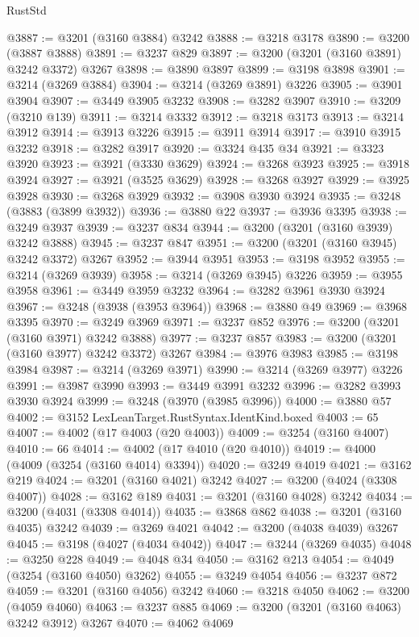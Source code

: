 \begin{lexlean}{RustStd}
\begin{coremodule}
@3887 := @3201 (@3160 @3884) @3242
@3888 := @3218 @3178
@3890 := @3200 (@3887 @3888)
@3891 := @3237 @829
@3897 := @3200 (@3201 (@3160 @3891) @3242 @3372) @3267
@3898 := @3890 @3897
@3899 := @3198 @3898
@3901 := @3214 (@3269 @3884)
@3904 := @3214 (@3269 @3891) @3226
@3905 := @3901 @3904
@3907 := @3449 @3905 @3232
@3908 := @3282 @3907
@3910 := @3209 (@3210 @139)
@3911 := @3214 @3332
@3912 := @3218 @3173
@3913 := @3214 @3912
@3914 := @3913 @3226
@3915 := @3911 @3914
@3917 := @3910 @3915 @3232
@3918 := @3282 @3917
@3920 := @3324 @435 @34
@3921 := @3323 @3920
@3923 := @3921 (@3330 @3629)
@3924 := @3268 @3923
@3925 := @3918 @3924
@3927 := @3921 (@3525 @3629)
@3928 := @3268 @3927
@3929 := @3925 @3928
@3930 := @3268 @3929
@3932 := @3908 @3930 @3924
@3935 := @3248 (@3883 (@3899 @3932))
@3936 := @3880 @22
@3937 := @3936 @3395
@3938 := @3249 @3937
@3939 := @3237 @834
@3944 := @3200 (@3201 (@3160 @3939) @3242 @3888)
@3945 := @3237 @847
@3951 := @3200 (@3201 (@3160 @3945) @3242 @3372) @3267
@3952 := @3944 @3951
@3953 := @3198 @3952
@3955 := @3214 (@3269 @3939)
@3958 := @3214 (@3269 @3945) @3226
@3959 := @3955 @3958
@3961 := @3449 @3959 @3232
@3964 := @3282 @3961 @3930 @3924
@3967 := @3248 (@3938 (@3953 @3964))
@3968 := @3880 @49
@3969 := @3968 @3395
@3970 := @3249 @3969
@3971 := @3237 @852
@3976 := @3200 (@3201 (@3160 @3971) @3242 @3888)
@3977 := @3237 @857
@3983 := @3200 (@3201 (@3160 @3977) @3242 @3372) @3267
@3984 := @3976 @3983
@3985 := @3198 @3984
@3987 := @3214 (@3269 @3971)
@3990 := @3214 (@3269 @3977) @3226
@3991 := @3987 @3990
@3993 := @3449 @3991 @3232
@3996 := @3282 @3993 @3930 @3924
@3999 := @3248 (@3970 (@3985 @3996))
@4000 := @3880 @57
@4002 := @3152 LexLeanTarget.RustSyntax.IdentKind.boxed
@4003 := 65
@4007 := @4002 (@17 @4003 (@20 @4003))
@4009 := @3254 (@3160 @4007)
@4010 := 66
@4014 := @4002 (@17 @4010 (@20 @4010))
@4019 := @4000 (@4009 (@3254 (@3160 @4014) @3394))
@4020 := @3249 @4019
@4021 := @3162 @219
@4024 := @3201 (@3160 @4021) @3242
@4027 := @3200 (@4024 (@3308 @4007))
@4028 := @3162 @189
@4031 := @3201 (@3160 @4028) @3242
@4034 := @3200 (@4031 (@3308 @4014))
@4035 := @3868 @862
@4038 := @3201 (@3160 @4035) @3242
@4039 := @3269 @4021
@4042 := @3200 (@4038 @4039) @3267
@4045 := @3198 (@4027 (@4034 @4042))
@4047 := @3244 (@3269 @4035)
@4048 := @3250 @228
@4049 := @4048 @34
@4050 := @3162 @213
@4054 := @4049 (@3254 (@3160 @4050) @3262)
@4055 := @3249 @4054
@4056 := @3237 @872
@4059 := @3201 (@3160 @4056) @3242
@4060 := @3218 @4050
@4062 := @3200 (@4059 @4060)
@4063 := @3237 @885
@4069 := @3200 (@3201 (@3160 @4063) @3242 @3912) @3267
@4070 := @4062 @4069

\end{coremodule}
\end{lexlean}
